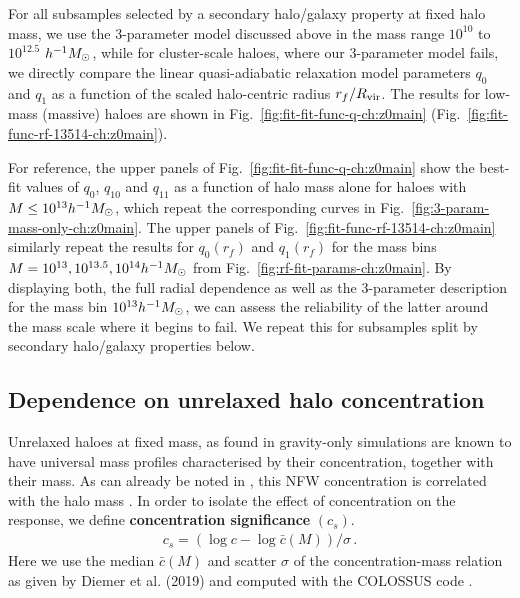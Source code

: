 For all subsamples selected by a secondary halo/galaxy property at fixed halo mass, we use the 3-parameter model discussed above in the mass range $10^{10}$ to $10^{12.5}$ $h^{-1}M_{\odot}$, 
while for cluster-scale haloes, where our 3-parameter model fails, we directly compare the linear quasi-adiabatic relaxation model parameters $q_0$ and $q_1$ as a function of the scaled halo-centric radius $r_f/R_{\rm vir}$. The results for low-mass (massive) haloes are shown in Fig.~\ref{fig:fit-fit-func-q-ch:z0main} (Fig.~\ref{fig:fit-func-rf-13514-ch:z0main}).


For reference, the upper panels of Fig.~\ref{fig:fit-fit-func-q-ch:z0main} show the best-fit values of $q_0$, $q_{10}$ and $q_{11}$ as a function of halo mass alone for haloes with $M\leq10^{13}h^{-1}M_{\odot}$,
which repeat the corresponding curves in Fig.~\ref{fig:3-param-mass-only-ch:z0main}. The upper panels of Fig.~\ref{fig:fit-func-rf-13514-ch:z0main} similarly repeat the results for $q_0(r_f)$ and $q_1(r_f)$ for the mass bins $M=10^{13},10^{13.5},10^{14}h^{-1}M_{\odot}$ from Fig.~\ref{fig:rf-fit-params-ch:z0main}. By displaying both, the full radial dependence as well as the 3-parameter description for the mass bin $10^{13}h^{-1}M_{\odot}$, we can assess the reliability of the latter around the mass scale where it begins to fail. We repeat this for subsamples split by secondary halo/galaxy properties below.



\subsection{Dependence on unrelaxed halo concentration}
Unrelaxed haloes at fixed mass, as found in gravity-only simulations are known to have universal mass profiles characterised by their concentration, together with their mass.
As can already be noted in , this NFW concentration is correlated with the halo mass \citep[see e.g. ][]{2006ApJ...652...71W,2007MNRAS.378...55M,2015ApJ...799..108D,2017MNRAS.468.2984P}.
In order to isolate the effect of concentration on the response, we define \textbf{concentration significance} $(c_s)$.
\begin{align}
c_s = \left(\log c- \log \bar{c}(M)\right)/\sigma\,. \nonumber
\end{align}
Here we use the median $\bar{c}(M)$ and scatter $\sigma$ of the concentration-mass relation as given by Diemer et al. (2019) \citep{2019ApJ...871..168D} and computed with the COLOSSUS code \citep[][]{2018ApJS..239...35D}.

